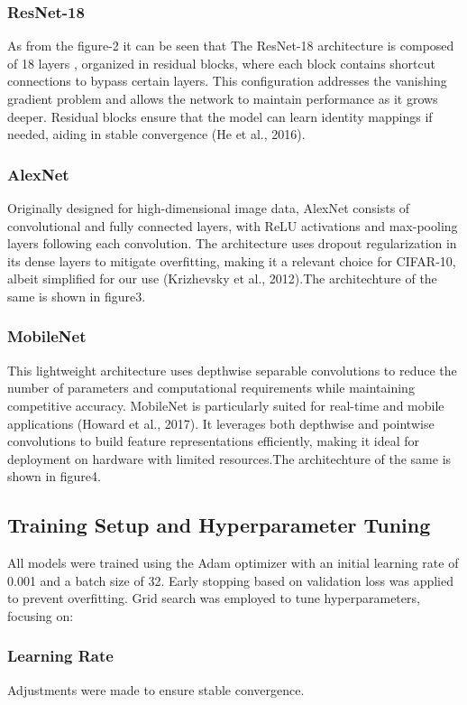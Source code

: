 \documentclass[10pt,twocolumn,letterpaper]{article}
\begin{document}
\subsubsection{ResNet-18} As from the figure-2 it can be seen that The ResNet-18 architecture is composed of 18 layers , organized in residual blocks, where each block contains shortcut connections to bypass certain layers. This configuration addresses the vanishing gradient problem and allows the network to maintain performance as it grows deeper. Residual blocks ensure that the model can learn identity mappings if needed, aiding in stable convergence (He et al., 2016).

\subsubsection{AlexNet} Originally designed for high-dimensional image data, AlexNet consists of convolutional and fully connected layers, with ReLU activations and max-pooling layers following each convolution. The architecture uses dropout regularization in its dense layers to mitigate overfitting, making it a relevant choice for CIFAR-10, albeit simplified for our use (Krizhevsky et al., 2012).The architechture of the same is shown in figure3.

\subsubsection{MobileNet} This lightweight architecture uses depthwise separable convolutions to reduce the number of parameters and computational requirements while maintaining competitive accuracy. MobileNet is particularly suited for real-time and mobile applications (Howard et al., 2017). It leverages both depthwise and pointwise convolutions to build feature representations efficiently, making it ideal for deployment on hardware with limited resources.The architechture of the same is shown in figure4.


\subsection{Training Setup and Hyperparameter Tuning}
All models were trained using the Adam optimizer with an initial learning rate of 0.001 and a batch size of 32. Early stopping based on validation loss was applied to prevent overfitting. Grid search was employed to tune hyperparameters, focusing on:

\subsubsection{Learning Rate} Adjustments were made to ensure stable convergence.
\end{document}
